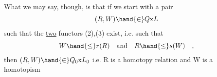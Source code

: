 What we may say,  though,  is that if we start with a pair
\[ (R,W) \hand{\in} Q\mathrm{x}L \]
such that the \uline{two} functors (2),(3)  exist,  i.e. such that
\[ W \hand{\leq} r(R) \quad\text{and}\quad R \hand{\leq} s(W) \quad , \]
then  $(R,W)\hand{\in} Q_0\mathrm{x}L_0$  i.e. R is a homotopy relation and W is a homotopism
